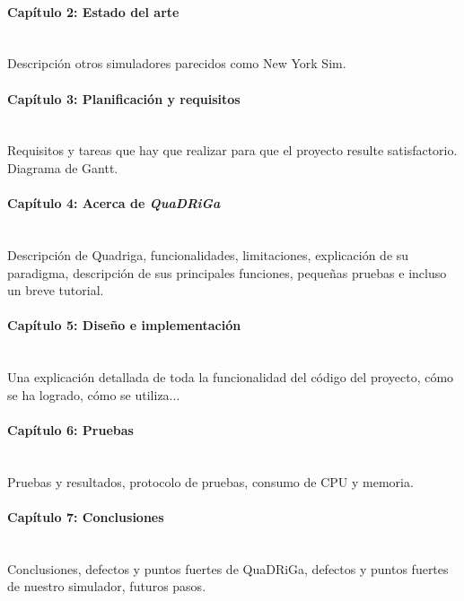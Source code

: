 \paragraph{Capítulo 2: Estado del arte} \mbox{} \\
	Descripción otros simuladores parecidos como New York Sim.

\paragraph{Capítulo 3: Planificación y requisitos} \mbox{} \\
	Requisitos y tareas que hay que realizar para que el proyecto resulte satisfactorio. Diagrama de Gantt.

\paragraph{Capítulo 4: Acerca de \textit{QuaDRiGa}} \mbox{} \\
	Descripción de Quadriga, funcionalidades, limitaciones, explicación de su paradigma, descripción de sus principales funciones, pequeñas pruebas e incluso un breve tutorial.

\paragraph{Capítulo 5: Diseño e implementación} \mbox{} \\
Una explicación detallada de toda la funcionalidad del código del proyecto, cómo se ha logrado, cómo se utiliza...

\paragraph{Capítulo 6: Pruebas} \mbox{} \\
Pruebas y resultados, protocolo de pruebas, consumo de CPU y memoria.

\paragraph{Capítulo 7: Conclusiones} \mbox{} \\
Conclusiones, defectos y puntos fuertes de QuaDRiGa, defectos y puntos fuertes de nuestro simulador, futuros pasos.

